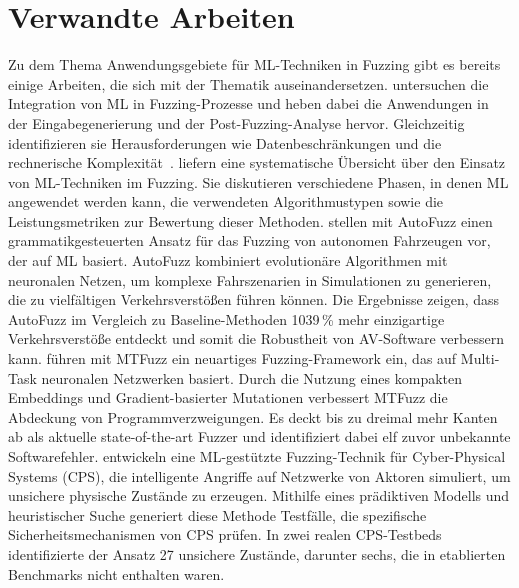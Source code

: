 
\section{Verwandte Arbeiten}\label{sec:related-work}
Zu dem Thema Anwendungsgebiete für ML-Techniken in Fuzzing gibt es bereits einige Arbeiten, die sich mit der Thematik auseinandersetzen.
\citet{saavedra_review_2019} untersuchen die Integration von ML in Fuzzing-Prozesse und heben dabei die Anwendungen in der
Eingabegenerierung und der Post-Fuzzing-Analyse hervor.
Gleichzeitig identifizieren sie Herausforderungen wie Datenbeschränkungen und die rechnerische Komplexität~\cite{schloegel_sok_2024}.\newline
\citet{wang_systematic_2020} liefern eine systematische Übersicht über den Einsatz von ML-Techniken im Fuzzing.
Sie diskutieren verschiedene Phasen, in denen ML angewendet werden kann, die verwendeten Algorithmustypen sowie die
Leistungsmetriken zur Bewertung dieser Methoden.\newline
\citet{zhong_neural_2022} stellen mit AutoFuzz einen grammatikgesteuerten Ansatz für das Fuzzing von autonomen Fahrzeugen
vor, der auf ML basiert.
AutoFuzz kombiniert evolutionäre Algorithmen mit neuronalen Netzen, um komplexe Fahrszenarien in Simulationen zu generieren,
die zu vielfältigen Verkehrsverstößen führen können.
Die Ergebnisse zeigen, dass AutoFuzz im Vergleich zu Baseline-Methoden \num{10}\text{--}\num{39}\,\unit{\percent}
mehr einzigartige Verkehrsverstöße entdeckt und somit die Robustheit von AV-Software verbessern kann.\newline
\citet{she_mtfuzz_2020} führen mit MTFuzz ein neuartiges Fuzzing-Framework ein, das auf Multi-Task neuronalen Netzwerken basiert.
Durch die Nutzung eines kompakten Embeddings und Gradient-basierter Mutationen verbessert MTFuzz die Abdeckung von
Programmverzweigungen.
Es deckt bis zu dreimal mehr Kanten ab als aktuelle state-of-the-art Fuzzer und identifiziert dabei elf zuvor unbekannte
Softwarefehler.\newline
\citet{chen_learning-guided_2019} entwickeln eine ML-gestützte Fuzzing-Technik für Cyber-Physical Systems (CPS), die intelligente
Angriffe auf Netzwerke von Aktoren simuliert, um unsichere physische Zustände zu erzeugen.
Mithilfe eines prädiktiven Modells und heuristischer Suche generiert diese Methode Testfälle, die spezifische
Sicherheitsmechanismen von CPS prüfen.
In zwei realen CPS-Testbeds identifizierte der Ansatz 27 unsichere Zustände, darunter sechs, die in etablierten Benchmarks
nicht enthalten waren.